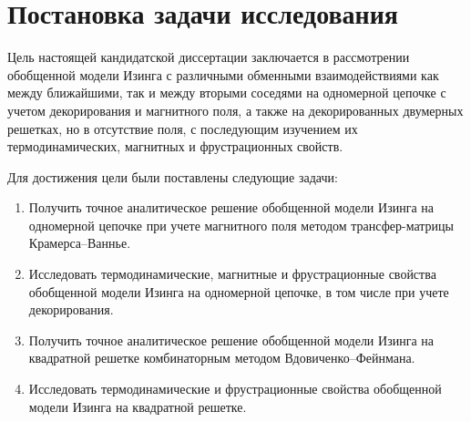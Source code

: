 \section{Постановка задачи исследования}

Цель настоящей кандидатской диссертации заключается в рассмотрении обобщенной модели Изинга с различными обменными взаимодействиями как между ближайшими, так и между вторыми соседями на одномерной цепочке с учетом декорирования и магнитного поля, а также на декорированных двумерных решетках, но в отсутствие поля, с последующим изучением их термодинамических, магнитных и фрустрационных свойств.

Для достижения цели были поставлены следующие задачи:
\begin{enumerate}
    \item Получить точное аналитическое решение обобщенной модели Изинга на одномерной цепочке при учете магнитного поля методом трансфер-матрицы Крамерса--Ваннье.
    \item Исследовать термодинамические, магнитные и фрустрационные свойства обобщенной модели Изинга на одномерной цепочке, в том числе при учете декорирования.
    \item Получить точное аналитическое решение обобщенной модели Изинга на квадратной решетке комбинаторным методом Вдовиченко--Фейнмана.
    \item Исследовать термодинамические и фрустрационные свойства обобщенной модели Изинга на квадратной решетке.
\end{enumerate}

\FloatBarrier
